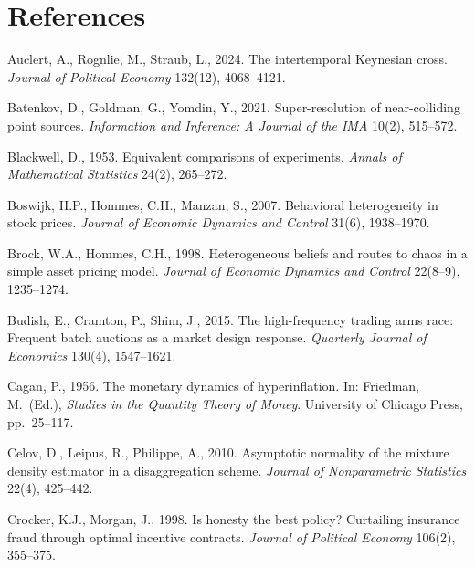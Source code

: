 \documentclass[11pt,letterpaper]{article}
\theoremstyle{definition}
\begin{document}
\section*{References}
\begin{list}{}{\small\setlength{\leftmargin}{1.8em}\setlength{\itemindent}{-1.8em}\setlength{\itemsep}{3pt}\setlength{\parsep}{0pt}}

\item Auclert, A., Rognlie, M., Straub, L., 2024. The intertemporal Keynesian cross. \emph{Journal of Political Economy} 132(12), 4068--4121.

\item Batenkov, D., Goldman, G., Yomdin, Y., 2021. Super-resolution of near-colliding point sources. \emph{Information and Inference: A Journal of the IMA} 10(2), 515--572.

\item Blackwell, D., 1953. Equivalent comparisons of experiments. \emph{Annals of Mathematical Statistics} 24(2), 265--272.

\item Boswijk, H.P., Hommes, C.H., Manzan, S., 2007. Behavioral heterogeneity in stock prices. \emph{Journal of Economic Dynamics and Control} 31(6), 1938--1970.

\item Brock, W.A., Hommes, C.H., 1998. Heterogeneous beliefs and routes to chaos in a simple asset pricing model. \emph{Journal of Economic Dynamics and Control} 22(8--9), 1235--1274.

\item Budish, E., Cramton, P., Shim, J., 2015. The high-frequency trading arms race: Frequent batch auctions as a market design response. \emph{Quarterly Journal of Economics} 130(4), 1547--1621.

\item Cagan, P., 1956. The monetary dynamics of hyperinflation. In: Friedman, M.\ (Ed.), \emph{Studies in the Quantity Theory of Money}. University of Chicago Press, pp.\ 25--117.

\item Celov, D., Leipus, R., Philippe, A., 2010. Asymptotic normality of the mixture density estimator in a disaggregation scheme. \emph{Journal of Nonparametric Statistics} 22(4), 425--442.

\item Crocker, K.J., Morgan, J., 1998. Is honesty the best policy? Curtailing insurance fraud through optimal incentive contracts. \emph{Journal of Political Economy} 106(2), 355--375.


\end{list}
\end{document}
